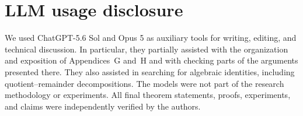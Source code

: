 \documentclass{article}
\begin{document}

\section*{LLM usage disclosure}
We used ChatGPT-5.6 Sol and Opus 5 as auxiliary tools for writing, editing, and
technical discussion. In particular, they partially assisted with the
organization and exposition of Appendices~G and~H and with checking parts of
the arguments presented there. They also assisted in searching for algebraic
identities, including quotient--remainder decompositions. The models were not
part of the research methodology or experiments. All final theorem statements,
proofs, experiments, and claims were independently verified by the authors.

\newpage
\clearpage
%
\end{document}
